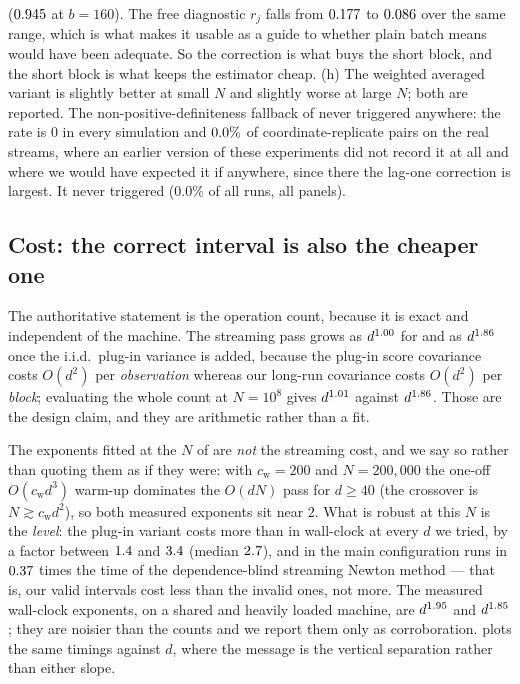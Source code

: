 ($0.945$ at $b=160$). The free diagnostic $r_j$ falls from $0.177$ to
$0.086$ over the same range, which is what makes it usable as a guide to whether plain
batch means would have been adequate. So the correction is what buys the short block, and the short
block is what keeps the estimator cheap.
(h) The weighted averaged variant is slightly better at small $N$ and slightly worse at
large $N$; both are reported.
The non-positive-definiteness fallback of  never triggered anywhere: the rate is
$0$ in every simulation and $0.0\%$ of coordinate-replicate pairs on the real streams,
where an earlier version of these experiments did not record it at all and where we would have
expected it if anywhere, since there the lag-one correction is largest. It never triggered
($0.0\%$ of all runs, all panels).
\subsection{Cost: the correct interval is also the cheaper one}
\label{app:costexp}

The authoritative statement is the operation count, because it is exact and independent of the
machine. The streaming pass grows as $d^{1.00}$ for \bgsn{} and as
$d^{1.86}$ once the i.i.d.\ plug-in variance is added, because the plug-in score
covariance costs $O(d^2)$ per \emph{observation} whereas our long-run covariance costs $O(d^2)$
per \emph{block}; evaluating the whole count at $N=10^{8}$ gives $d^{1.01}$ against
$d^{1.86}$. Those are the design claim, and they are arithmetic rather than a fit.

The exponents fitted at the $N$ of  are \emph{not} the streaming cost, and we
say so rather than quoting them as if they were: with $c_{\mathrm w}=200$ and $N=200{,}000$ the
one-off $O(c_{\mathrm w}d^3)$ warm-up dominates the $O(dN)$ pass for $d\ge40$
(the crossover is $N\gtrsim c_{\mathrm w}d^2$), so both measured exponents sit near $2$. What
is robust at this $N$ is the \emph{level}: the plug-in variant costs more than \bgsn{} in
wall-clock at every $d$ we tried, by a factor between $1.4$ and
$3.4$ (median $2.7$), and in the main configuration \bgsn{}
runs in $0.37$ times the time of the dependence-blind streaming Newton method --- that
is, our valid intervals cost less than the invalid ones, not more. The measured wall-clock
exponents, on a shared and heavily loaded machine, are $d^{1.95}$ and
$d^{1.85}$; they are noisier than the counts and we report them only as corroboration.
\RefCostFig{} plots the same timings against $d$, where the message is the vertical separation
rather than either slope.

